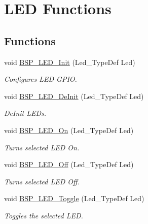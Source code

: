 \hypertarget{group___s_t_m32_f0_x_x___n_u_c_l_e_o___l_e_d___functions}{}\section{L\+ED Functions}
\label{group___s_t_m32_f0_x_x___n_u_c_l_e_o___l_e_d___functions}
\subsection*{Functions}
\begin{DoxyCompactItemize}
\item 
void \hyperlink{group___s_t_m32_f0_x_x___n_u_c_l_e_o___l_e_d___functions_gab58a4f16a476a53653c5c400e3bed158}{B\+S\+P\+\_\+\+L\+E\+D\+\_\+\+Init} (Led\+\_\+\+Type\+Def Led)
\begin{DoxyCompactList}\small\item\em Configures L\+ED G\+P\+IO. \end{DoxyCompactList}\item 
void \hyperlink{group___s_t_m32_f0_x_x___n_u_c_l_e_o___l_e_d___functions_ga8cb1d5b32557d492b8bf0f7109bd6d3f}{B\+S\+P\+\_\+\+L\+E\+D\+\_\+\+De\+Init} (Led\+\_\+\+Type\+Def Led)
\begin{DoxyCompactList}\small\item\em De\+Init L\+E\+Ds. \end{DoxyCompactList}\item 
void \hyperlink{group___s_t_m32_f0_x_x___n_u_c_l_e_o___l_e_d___functions_gaee9c16b16384834c69efabf58f423d6f}{B\+S\+P\+\_\+\+L\+E\+D\+\_\+\+On} (Led\+\_\+\+Type\+Def Led)
\begin{DoxyCompactList}\small\item\em Turns selected L\+ED On. \end{DoxyCompactList}\item 
void \hyperlink{group___s_t_m32_f0_x_x___n_u_c_l_e_o___l_e_d___functions_gaef268680154ca15c45066d64d41f9467}{B\+S\+P\+\_\+\+L\+E\+D\+\_\+\+Off} (Led\+\_\+\+Type\+Def Led)
\begin{DoxyCompactList}\small\item\em Turns selected L\+ED Off. \end{DoxyCompactList}\item 
void \hyperlink{group___s_t_m32_f0_x_x___n_u_c_l_e_o___l_e_d___functions_ga1b9eabba7d498f41d6f16587ec0f9732}{B\+S\+P\+\_\+\+L\+E\+D\+\_\+\+Toggle} (Led\+\_\+\+Type\+Def Led)
\begin{DoxyCompactList}\small\item\em Toggles the selected L\+ED. \end{DoxyCompactList}\end{DoxyCompactItemize}


